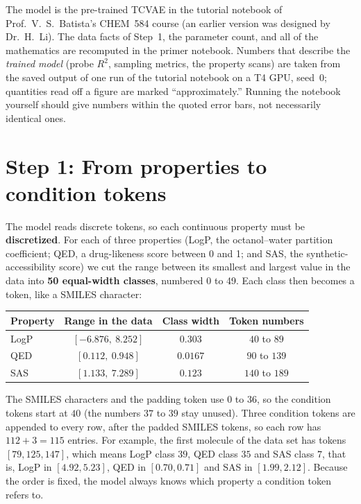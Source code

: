 \documentclass[11pt]{article}
\begin{document}
\begin{keybox}
The model is the pre-trained TCVAE in the tutorial notebook of Prof.\ V.~S.~Batista's CHEM~584 course (an earlier version was designed by Dr.\ H.~Li). The data facts of Step~1, the parameter count, and all of the mathematics are recomputed in the primer notebook. Numbers that describe the \emph{trained model} (probe $R^2$, sampling metrics, the property scans) are taken from the saved output of one run of the tutorial notebook on a T4 GPU, seed~0; quantities read off a figure are marked ``approximately.'' Running the notebook yourself should give numbers within the quoted error bars, not necessarily identical ones.
\end{keybox}

\section{Step 1: From properties to condition tokens}
The model reads discrete tokens, so each continuous property must be \textbf{discretized}. For each of three properties (LogP, the octanol--water partition coefficient; QED, a drug-likeness score between 0 and 1; and SAS, the synthetic-accessibility score) we cut the range between its smallest and largest value in the data into \textbf{50 equal-width classes}, numbered 0 to 49. Each class then becomes a token, like a SMILES character:

\begin{center}
\small
\begin{tabular}{@{}lccc@{}}
\toprule
Property & Range in the data & Class width & Token numbers\\
\midrule
LogP & $[-6.876,\ 8.252]$ & $0.303$ & $40$ to $89$\\
QED & $[0.112,\ 0.948]$ & $0.0167$ & $90$ to $139$\\
SAS & $[1.133,\ 7.289]$ & $0.123$ & $140$ to $189$\\
\bottomrule
\end{tabular}
\end{center}

The SMILES characters and the padding token use $0$ to $36$, so the condition tokens start at $40$ (the numbers $37$ to $39$ stay unused). Three condition tokens are appended to every row, after the padded SMILES tokens, so each row has $112+3=115$ entries. For example, the first molecule of the data set has tokens $[79,125,147]$, which means LogP class $39$, QED class $35$ and SAS class $7$, that is, LogP in $[4.92,5.23]$, QED in $[0.70,0.71]$ and SAS in $[1.99,2.12]$. Because the order is fixed, the model always knows which property a condition token refers to.
\end{document}
